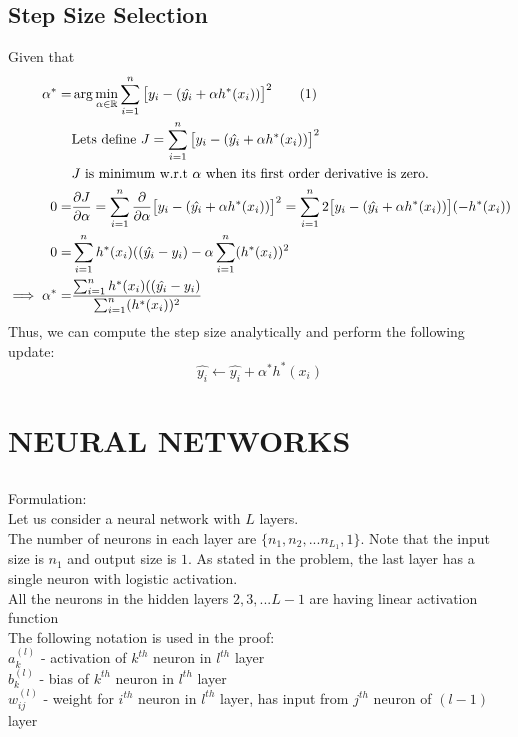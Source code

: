 \documentclass[a4paper,doc,notimes]{article}
\newcommand\numberthis{\addtocounter{equation}{1}\tag{\theequation}}
\begin{document}
\subsection {Step Size Selection}
Given that \\
\begin{align*}
	\alpha^* = & \arg \min_{\alpha \in \mathbb{R}} \sum_{i=1}^{n} \big[y_i - (\hat{y_i} + \alpha h^*(x_i)) \big]^2 \numberthis \\ \label{eqn:bestalpha1}
	& \text{Lets define } J = \sum_{i=1}^{n} \big[y_i - (\hat{y_i} + \alpha h^*(x_i)) \big]^2 \\
	& \text{$J$ is minimum w.r.t $\alpha$ when its first order derivative is zero.} \\
 0 = & \frac{\partial J}{\partial \alpha} = \sum_{i=1}^{n}  \frac{\partial }{\partial \alpha} \big[y_i - (\hat{y_i} + \alpha h^*(x_i)) \big]^2  = \sum_{i=1}^{n}  2 \big[y_i - (\hat{y_i} + \alpha h^*(x_i)) \big] (- h^*(x_i))\\
 0 = &   \sum_{i=1}^{n}  h^*(x_i)((\hat{y_i} - y_i) - \alpha  \sum_{i=1}^{n} (h^*(x_i) )^2 \\
 \implies \alpha^* =&  \frac{ \sum_{i=1}^{n}  h^*(x_i)((\hat{y_i} - y_i)}{\sum_{i=1}^{n} (h^*(x_i) )^2 } %
\end{align*}
Thus, we can compute the step size analytically and perform the following update:
$$
	\hat{y_i} \leftarrow \hat{y_i} + \alpha^* h^*(x_i)
$$

\section{ NEURAL NETWORKS}
\subsection{}
Formulation: \\
Let us consider a neural network with $L$ layers. \\
The number of neurons in each layer are $\{n_1, n_2, ... n_{L_1} , 1\}$. Note that the input size is $n_1$ and output size is $1$.
As stated in the problem, the last layer has a single neuron with logistic activation. \\
All the neurons in the hidden layers $2, 3, ... L-1$ are having linear activation function \\
The following notation is used in the proof: \\
$a^{(l)}_k$ - activation of $k^{th}$  neuron in $l^{th}$ layer \\
$b^{(l)}_k$ - bias of $k^{th}$  neuron in $l^{th}$ layer  \\
$w^{(l)}_{ij}$ - weight for $i^{th}$  neuron in $l^{th}$ layer, has input from $j^{th}$ neuron of $(l-1)$ layer \\
\end{document}
